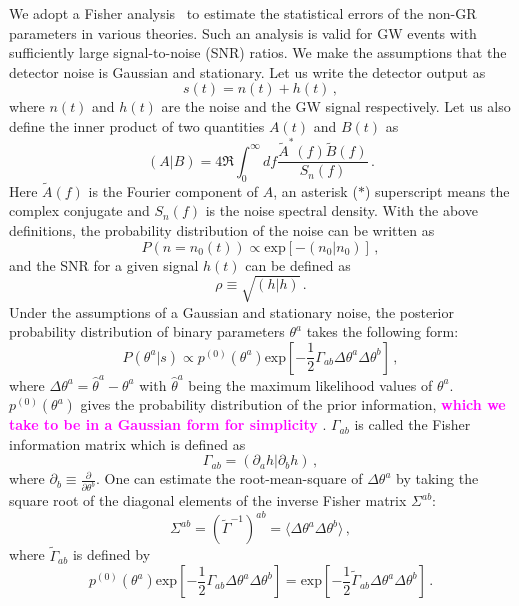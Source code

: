 \documentclass[prd,twocolumn,nofootinbib]{revtex4-1}
\newcommand\be{\begin{equation}}
\newcommand\ee{\end{equation}}
\newcommand{\kent}[1]{\textcolor{magenta}{\textbf{#1}} }
\begin{document}
We adopt a Fisher analysis~\cite{Cutler:1994ys} to estimate the statistical errors of the non-GR parameters in various theories. Such an analysis is valid for GW events with sufficiently large signal-to-noise (SNR) ratios. We make the assumptions that the detector noise is Gaussian and stationary. Let us write the detector output as
\be
s(t)=n(t)+h(t)\,,
\ee
where $n(t)$ and $h(t)$ are the noise and the GW signal respectively. Let us also define the inner product of two quantities $A(t)$ and $B(t)$ as
 \be
 \left(A|B\right)=4\Re\int_0^\infty df \frac{\tilde{A}^*(f)\tilde{B}(f)}{S_n \left( f \right)}\,.
 \ee
Here $\tilde{A}(f)$ is the Fourier component of $A$, an asterisk ($*$) superscript means the complex conjugate and $S_n\left(f\right)$ is the noise spectral density. With the above definitions, the probability distribution of the noise can be written as
 \be
P\left(n=n_0(t)\right) \propto \text{exp}\left[-\left(n_0|n_0\right)\right]\,,
\ee
and the SNR for a given signal $h(t)$ can be defined as
\be
\rho \equiv\sqrt{\left(h|h\right)}\,.
\ee
Under the assumptions of a Gaussian and stationary noise, the posterior probability distribution of binary parameters $\theta^a$ takes the following form:
\be
P\left(\theta^a|s\right) \propto p^{(0)}\left(\theta^a\right) \text{exp}\left[-\frac{1}{2} \Gamma_{ab} \Delta\theta^a\Delta \theta^b \right]\,,
\ee
where $\Delta \theta^a=\hat{\theta}^a-\theta^a$ with $\hat{\theta}^a$ being the maximum likelihood values of $\theta^a$. $p^{(0)}\left(\theta^a\right)$ gives the probability distribution of the prior information, \kent{which we take to be in a Gaussian form for simplicity}. $\Gamma_{ab}$ is called the Fisher information matrix which is defined as
\be
\Gamma_{ab}=\left(\partial_a h|\partial_b h \right)\,,
\ee
where $\partial_b\equiv \frac{\partial}{\partial \theta^b}$. One can estimate the root-mean-square of $\Delta \theta^a$ by taking the square root of the diagonal elements of the inverse Fisher matrix $\Sigma^{ab}$: 
\be
\Sigma^{ab}=\left(\tilde{\Gamma}^{-1}\right)^{ab}=\langle\Delta\theta^a\Delta \theta^b\rangle\,,
\ee
where $\tilde{\Gamma}_{ab}$ is defined by
\be
p^{(0)}\left(\theta^a\right) \text{exp}\left[-\frac{1}{2} \Gamma_{ab} \Delta\theta^a\Delta \theta^b \right]=\text{exp}\left[-\frac{1}{2} \tilde{\Gamma}_{ab} \Delta\theta^a\Delta \theta^b \right]\,.
\ee
\end{document}
